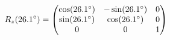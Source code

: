 \documentclass[preview]{standalone}
\begin{document}
\begin{align*}
\special{dvisvgm:raw <g id='unique000'>}R_z(26.1^\circ) = \begin{pmatrix} \cos(26.1^\circ) & -\sin(26.1^\circ) & 0 \\ \sin(26.1^\circ) & \cos(26.1^\circ) & 0 \\ 0 & 0 & 1 \end{pmatrix}\special{dvisvgm:raw </g>}
\end{align*}
\end{document}
